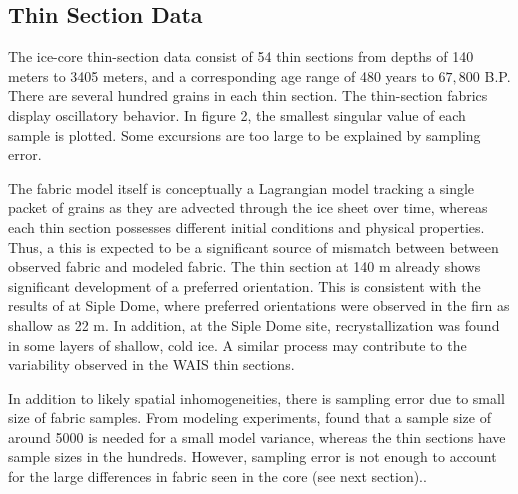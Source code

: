 \documentclass{igs}
\begin{document}
\subsection{Thin Section Data}
The ice-core thin-section data consist of 54 thin sections from depths of 140 meters to 3405 meters, and a corresponding age range of 480 years to $67,800$ B.P. There are several hundred grains in each thin section. The thin-section fabrics display oscillatory behavior. In figure 2, the smallest singular value of each sample is plotted. Some excursions are too large to be explained by sampling error.  

The fabric model itself is conceptually a Lagrangian model tracking a single packet of grains as they are advected through the ice sheet over time, whereas each thin section possesses different initial conditions and physical properties. Thus, a this is expected to be a significant source of mismatch between between observed fabric and modeled fabric. The thin section at 140 m already shows significant development of a preferred orientation. This is consistent with the results of \citet{diprinzio2005} at Siple Dome, where preferred orientations were observed in the firn as shallow as 22 m. In addition, at the Siple Dome site, recrystallization was found in some layers of shallow, cold ice. A similar process may contribute to the variability observed in the WAIS thin sections.

 In addition to likely spatial inhomogeneities, there is sampling error due to small size of fabric samples. From modeling experiments, \citet{thorsteinsson2002nni} found that a sample size of around 5000 is needed for a small model variance, whereas the thin sections have sample sizes in the hundreds. However, sampling error is not enough to account for the large differences in fabric seen in the core (see next section)..    
\end{document}
